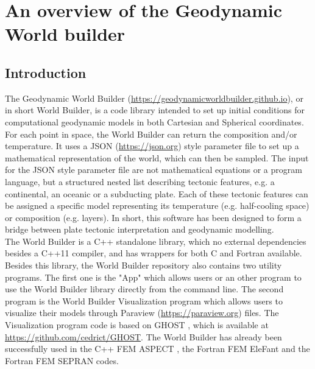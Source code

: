 \documentclass{book}
\newcommand{\GWB}{{Geodynamic World Builder}}
\newcommand{\WB}{{World Builder}}
\newcommand{\paraview}{{Paraview}}
\newcommand{\ghost}{{GHOST}}
\newcommand{\aspect}{{ASPECT}}
\newcommand{\elephant}{{EleFant}}
\newcommand{\sepran}{{SEPRAN}}
\begin{document}
\part{An overview of the Geodynamic World builder}
\chapter{Introduction}
The \GWB{} (\url{https://geodynamicworldbuilder.github.io}), or in short \WB{}, is a code library intended to set up initial conditions for computational geodynamic models in both Cartesian and Spherical coordinates. For each point in space, the \WB{} can return the composition and/or temperature. It uses a JSON (\url{https://json.org}) style parameter file to set up a mathematical representation of the world, which can then be sampled. The input for the JSON style parameter file are not mathematical equations or a program language, but a structured nested list describing tectonic features, e.g. a continental, an oceanic or a subducting plate. Each of these tectonic features can be assigned a specific model representing its temperature (e.g. half-cooling space) or composition (e.g. layers). In short, this software has been designed to form a bridge between plate tectonic interpretation and geodynamic modelling.
\\
The \WB{} is a C++ standalone library, which no external dependencies besides a C++11 compiler, and has wrappers for both C and Fortran available. Besides this library, the \WB{} repository also contains two utility programs. The first one is the "App" which allows users or an other program to use the \WB{} library directly from the command line. The second program is the \WB{} Visualization program which allows users to visualize their models through \paraview{} (\url{https://paraview.org}) files. The Visualization program code is based on \ghost{} \citep{Thieulot_2018}, which is available at \url{https://github.com/cedrict/GHOST}. The \WB{} has already been successfully used in the C++ FEM \aspect{} \citep{KHB12,heister_aspect_methods2,aspect-doi-v2.0.1,aspectmanual}, the Fortran FEM \elephant{} \citep{Thieulot_2017} and the Fortran FEM \sepran \citep{vasy15} codes.
\end{document}
